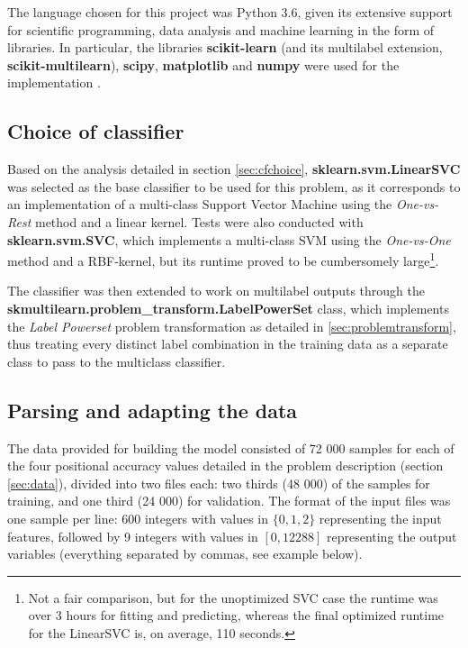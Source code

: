 \documentclass{kthreport}
\theoremstyle{definition}
\begin{document}
The language chosen for this project was Python 3.6, given its extensive support for scientific programming, data analysis and machine learning in the form of libraries. In particular, the libraries \textbf{scikit-learn} (and its multilabel extension, \textbf{scikit-multilearn}), \textbf{scipy}, \textbf{matplotlib} and \textbf{numpy} were used for the implementation \autocite{scikit-learn,scikit-multilearn,scipy,matplotlib,numpy}.

\subsection{Choice of classifier}

Based on the analysis detailed in section \ref{sec:cfchoice}, \textbf{sklearn.svm.LinearSVC} was selected as the base classifier to be used for this problem, as it corresponds to an implementation of a multi-class Support Vector Machine using the \emph{One-vs-Rest} method and a linear kernel. Tests were also conducted with \textbf{sklearn.svm.SVC}, which implements a multi-class SVM using the \emph{One-vs-One} method and a RBF-kernel, but its runtime proved to be cumbersomely large\footnote{Not a fair comparison, but for the unoptimized SVC case the runtime was over 3 hours for fitting and predicting, whereas the final optimized runtime for the LinearSVC is, on average, 110 seconds.}.

The classifier was then extended to work on multilabel outputs through the \textbf{skmultilearn.problem\_transform.LabelPowerSet} class, which implements the \emph{Label Powerset} problem transformation as detailed in \ref{sec:problemtransform}, thus treating every distinct label combination in the training data as a separate class to pass to the multiclass classifier.

\subsection{Parsing and adapting the data}

The data provided for building the model consisted of 72 000 samples for each of the four positional accuracy values detailed in the problem description (section \ref{sec:data}), divided into two files each: two thirds (48 000) of the samples for training, and one third (24 000) for validation. The format of the input files was one sample per line: 600 integers with values in $\{0, 1, 2\}$ representing the input features, followed by 9 integers with values in $[0, 12288]$ representing the output variables (everything separated by commas, see example below).
\end{document}
